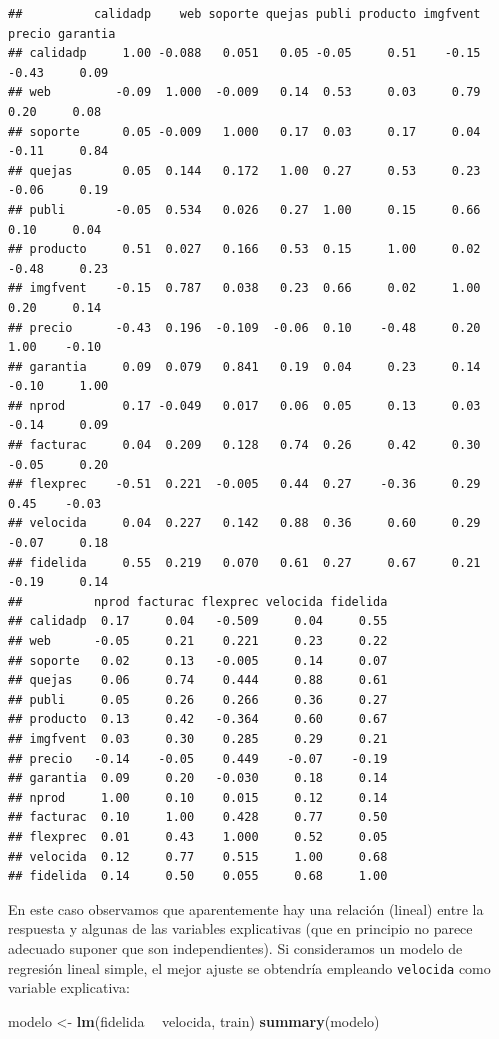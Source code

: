 \documentclass[
]{book}
\newenvironment{Shaded}{\begin{snugshade}}{\end{snugshade}}
\newcommand{\KeywordTok}[1]{\textcolor[rgb]{0.13,0.29,0.53}{\textbf{#1}}}
\newcommand{\NormalTok}[1]{#1}
\newcommand{\OperatorTok}[1]{\textcolor[rgb]{0.81,0.36,0.00}{\textbf{#1}}}
\newcommand{\StringTok}[1]{\textcolor[rgb]{0.31,0.60,0.02}{#1}}
\theoremstyle{break}
\theoremstyle{definition}
\theoremstyle{definition}
\theoremstyle{definition}
\theoremstyle{remark}
\begin{document}
\begin{verbatim}
##          calidadp    web soporte quejas publi producto imgfvent precio garantia
## calidadp     1.00 -0.088   0.051   0.05 -0.05     0.51    -0.15  -0.43     0.09
## web         -0.09  1.000  -0.009   0.14  0.53     0.03     0.79   0.20     0.08
## soporte      0.05 -0.009   1.000   0.17  0.03     0.17     0.04  -0.11     0.84
## quejas       0.05  0.144   0.172   1.00  0.27     0.53     0.23  -0.06     0.19
## publi       -0.05  0.534   0.026   0.27  1.00     0.15     0.66   0.10     0.04
## producto     0.51  0.027   0.166   0.53  0.15     1.00     0.02  -0.48     0.23
## imgfvent    -0.15  0.787   0.038   0.23  0.66     0.02     1.00   0.20     0.14
## precio      -0.43  0.196  -0.109  -0.06  0.10    -0.48     0.20   1.00    -0.10
## garantia     0.09  0.079   0.841   0.19  0.04     0.23     0.14  -0.10     1.00
## nprod        0.17 -0.049   0.017   0.06  0.05     0.13     0.03  -0.14     0.09
## facturac     0.04  0.209   0.128   0.74  0.26     0.42     0.30  -0.05     0.20
## flexprec    -0.51  0.221  -0.005   0.44  0.27    -0.36     0.29   0.45    -0.03
## velocida     0.04  0.227   0.142   0.88  0.36     0.60     0.29  -0.07     0.18
## fidelida     0.55  0.219   0.070   0.61  0.27     0.67     0.21  -0.19     0.14
##          nprod facturac flexprec velocida fidelida
## calidadp  0.17     0.04   -0.509     0.04     0.55
## web      -0.05     0.21    0.221     0.23     0.22
## soporte   0.02     0.13   -0.005     0.14     0.07
## quejas    0.06     0.74    0.444     0.88     0.61
## publi     0.05     0.26    0.266     0.36     0.27
## producto  0.13     0.42   -0.364     0.60     0.67
## imgfvent  0.03     0.30    0.285     0.29     0.21
## precio   -0.14    -0.05    0.449    -0.07    -0.19
## garantia  0.09     0.20   -0.030     0.18     0.14
## nprod     1.00     0.10    0.015     0.12     0.14
## facturac  0.10     1.00    0.428     0.77     0.50
## flexprec  0.01     0.43    1.000     0.52     0.05
## velocida  0.12     0.77    0.515     1.00     0.68
## fidelida  0.14     0.50    0.055     0.68     1.00
\end{verbatim}

En este caso observamos que aparentemente hay una relación (lineal) entre la respuesta y algunas de las variables explicativas (que en principio no parece adecuado suponer que son independientes).
Si consideramos un modelo de regresión lineal simple, el mejor ajuste se obtendría empleando \texttt{velocida} como variable explicativa:

\begin{Shaded}
\begin{Highlighting}[]
\NormalTok{modelo <-}\StringTok{ }\KeywordTok{lm}\NormalTok{(fidelida }\OperatorTok{~}\StringTok{ }\NormalTok{velocida, train)}
\KeywordTok{summary}\NormalTok{(modelo)}
\end{Highlighting}
\end{Shaded}
\end{document}
